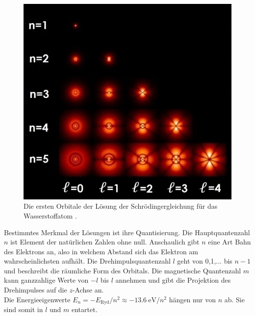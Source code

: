 \begin{figure}
  \centering
  \includegraphics[width=\textwidth]{data/orbitale.jpg}
  \caption{Die ersten Orbitale der Lösung der Schrödingergleichung für das Wasserstoffatom \cite{orbitale}.}
  \label{fig:orbitale}
\end{figure}

Bestimmtes Merkmal der Lösungen ist ihre Quantisierung. Die Hauptquantenzahl $n$ ist Element der natürlichen Zahlen ohne null. Anschaulich gibt $n$ eine Art Bahn des Elektrons an, also in welchem Abstand sich das Elektron am wahrscheinlichsten aufhält. Die Drehimpulsquantenzahl $l$ geht von 0,1,... bis $n-1$ und beschreibt die räumliche Form des Orbitals. Die magnetische Quantenzahl $m$ kann ganzzahlige Werte von $-l$ bis $l$ annehmen und gibt die Projektion des Drehimpulses auf die $z$-Achse an.\\
Die Energieeigenwerte $E_n = -E_{\text{Ryd}}/n^2 \approx -\SI{13.6}{\electronvolt}/n^2$ hängen nur von $n$ ab. Sie sind somit in $l$ und $m$ entartet.

